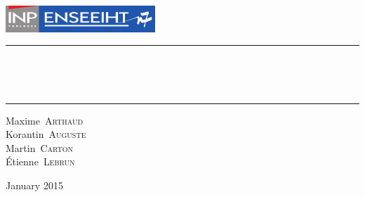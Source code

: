 \begin{titlepage}
  \begin{center}
    \includegraphics[height=1cm]{LogoEnseeiht}\\\vspace{1cm}
    \hrule\vspace{0.5cm}
    \textsc{\Large\thesubtitle}
    \\\vspace{0.5cm}

    \textbf{\huge\thetitle}
    \\\vspace{0.4cm}
    \hrule\vspace{2cm}

    {\large
      Maxime~\textsc{Arthaud}      \\
      Korantin~\textsc{Auguste}    \\
      Martin~\textsc{Carton}       \\
      Étienne~\textsc{Lebrun}
    }

    \vfill
    {\large January 2015}
  \end{center}
\end{titlepage}
